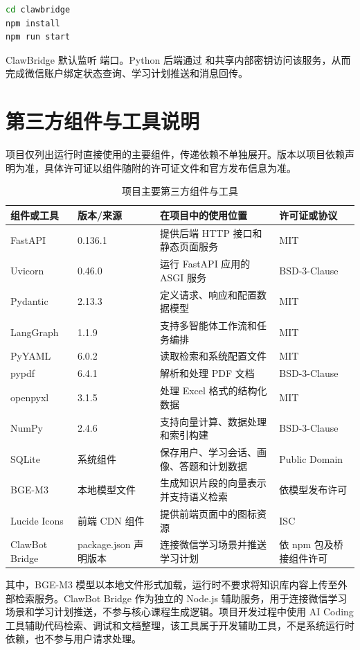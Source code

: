 \begin{lstlisting}[language=bash,caption={ClawBridge 启动命令},label={lst:clawbridge-start}]
cd clawbridge
npm install
npm run start
\end{lstlisting}

ClawBridge 默认监听  端口。Python 后端通过  和共享内部密钥访问该服务，从而完成微信账户绑定状态查询、学习计划推送和消息回传。

\section{第三方组件与工具说明}

项目仅列出运行时直接使用的主要组件，传递依赖不单独展开。版本以项目依赖声明为准，具体许可证以组件随附的许可证文件和官方发布信息为准。

\begin{table}[H]
\centering
\small
\begin{tabularx}{\linewidth}{p{3.2cm}p{2.5cm}X p{2.5cm}}
\toprule
组件或工具 & 版本/来源 & 在项目中的使用位置 & 许可证或协议 \\
\midrule
FastAPI & 0.136.1 & 提供后端 HTTP 接口和静态页面服务 & MIT \\
Uvicorn & 0.46.0 & 运行 FastAPI 应用的 ASGI 服务 & BSD-3-Clause \\
Pydantic & 2.13.3 & 定义请求、响应和配置数据模型 & MIT \\
LangGraph & 1.1.9 & 支持多智能体工作流和任务编排 & MIT \\
PyYAML & 6.0.2 & 读取检索和系统配置文件 & MIT \\
pypdf & 6.4.1 & 解析和处理 PDF 文档 & BSD-3-Clause \\
openpyxl & 3.1.5 & 处理 Excel 格式的结构化数据 & MIT \\
NumPy & 2.4.6 & 支持向量计算、数据处理和索引构建 & BSD-3-Clause \\
SQLite & 系统组件 & 保存用户、学习会话、画像、答题和计划数据 & Public Domain \\
BGE-M3 & 本地模型文件 & 生成知识片段的向量表示并支持语义检索 & 依模型发布许可 \\
Lucide Icons & 前端 CDN 组件 & 提供前端页面中的图标资源 & ISC \\
ClawBot Bridge & package.json 声明版本 & 连接微信学习场景并推送学习计划 & 依 npm 包及桥接组件许可 \\
\bottomrule
\end{tabularx}
\caption{项目主要第三方组件与工具}
\end{table}

其中，BGE-M3 模型以本地文件形式加载，运行时不要求将知识库内容上传至外部检索服务。ClawBot Bridge 作为独立的 Node.js 辅助服务，用于连接微信学习场景和学习计划推送，不参与核心课程生成逻辑。项目开发过程中使用 AI Coding 工具辅助代码检索、调试和文档整理，该工具属于开发辅助工具，不是系统运行时依赖，也不参与用户请求处理。

